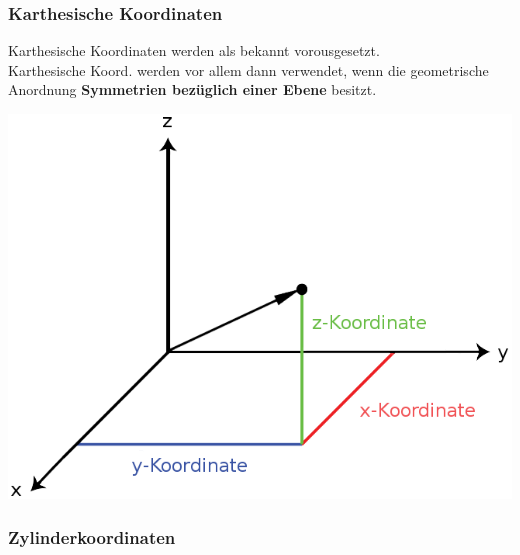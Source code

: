 	\subsubsection{Karthesische Koordinaten}

	 {}
	\beginip
	Karthesische Koordinaten werden als bekannt vorousgesetzt. \\
	Karthesische Koord. werden vor allem dann verwendet, wenn die geometrische Anordnung \textbf{Symmetrien bezüglich einer Ebene} besitzt.
	\begin{center}
		\includegraphics[scale=0.3]{img/cartesian.png}
	\end{center}
	\iend

	\newpage


	\subsubsection{Zylinderkoordinaten}

